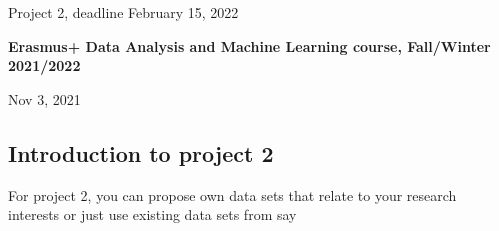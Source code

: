 \documentclass[%
oneside,                 %
final,                   %
10pt]{article}
\begin{document}

\newcommand{\exercisesection}[1]{\subsection*{#1}}






\thispagestyle{empty}

\begin{center}
{\LARGE\bf
\begin{spacing}{1.25}
Project 2, deadline February 15, 2022
\end{spacing}
}
\end{center}


\begin{center}
{\bf Erasmus+ Data Analysis and Machine Learning course, Fall/Winter 2021/2022${}^{}$} \\ [0mm]
\end{center}

\begin{center}
\end{center}
    

\begin{center}
Nov 3, 2021
\end{center}

\vspace{1cm}


\subsection*{Introduction to project 2}

For project 2, you can propose own data sets that relate to your
research interests or just use existing data sets from say
\end{document}

